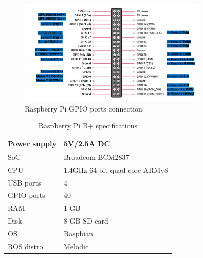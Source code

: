 \begin{figure}[H]
    \centering
 	\includegraphics[trim=0 0 0 0,clip,width=0.8\textwidth]{Figs/RPI.png}
    \caption{Raspberry Pi GPIO ports connection}
    \label{fig:RPI_ports}
\end{figure}

\begin{table}[H]
\caption{Raspberry Pi B+ specifications}
\begin{centering}
\begin{tabular}{>{\centering}p{7cm}>{\centering}p{4cm}}
\hline 
\raggedright{}Power supply & \raggedright{}5V/2.5A DC\tabularnewline
\hline 
\raggedright{}SoC & \raggedright{}Broadcom BCM2837\tabularnewline
\hline 
\raggedright{}CPU & \raggedright{}1.4GHz 64-bit quad-core ARMv8\tabularnewline
\hline 
\raggedright{}USB ports & \raggedright{}4\tabularnewline
\hline 
\raggedright{}GPIO ports & \raggedright{}40\tabularnewline
\hline 
\raggedright{}RAM & \raggedright{}1 GB\tabularnewline
\hline 
\raggedright{}Disk & \raggedright{}8 GB SD card\tabularnewline
\hline 
\raggedright{}OS & \raggedright{}Raspbian\tabularnewline
\hline 
\raggedright{}ROS distro & \raggedright{}Melodic\tabularnewline
\hline 
\end{tabular}
\par\end{centering}
\end{table}

